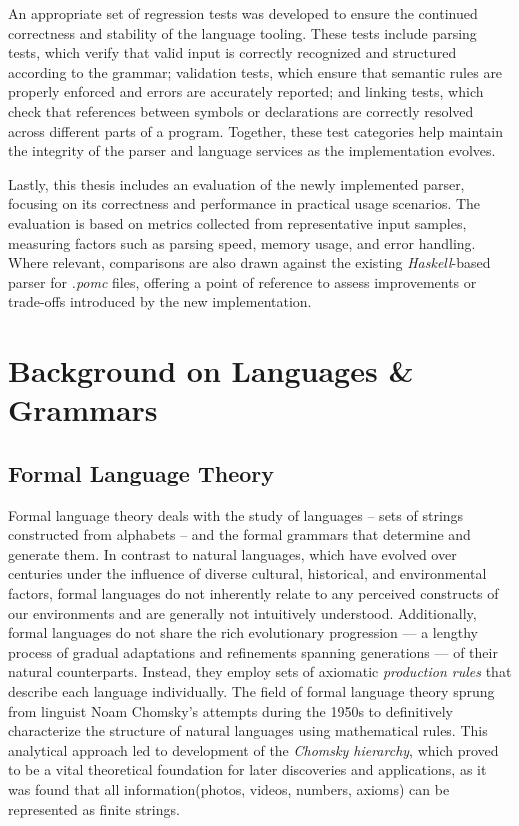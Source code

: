 \documentclass[11pt]{report}
\begin{document}
An appropriate set of regression tests was developed to ensure the continued correctness and stability of the language tooling.
These tests include parsing tests, which verify that valid input is correctly recognized and structured according to the grammar; validation tests,
which ensure that semantic rules are properly enforced and errors are accurately reported; and linking tests, which check that references between symbols
or declarations are correctly resolved across different parts of a program. Together, these test categories help maintain the integrity of the parser and language services as
the implementation evolves.

Lastly, this thesis includes an evaluation of the newly implemented parser, focusing on its correctness and performance in practical usage scenarios.
The evaluation is based on metrics collected from representative input samples, measuring factors such as parsing speed, memory usage, and error handling.
Where relevant, comparisons are also drawn against the existing \textit{Haskell}-based parser for \textit{.pomc} files, offering a point of reference to assess
improvements or trade-offs introduced by the new implementation.

\chapter{Background on Languages \& Grammars}


\section{Formal Language Theory}

Formal language theory deals with the study of languages – sets of strings constructed from alphabets – and the formal grammars that determine and generate them.
In contrast to natural languages, which have evolved over centuries under the influence of diverse cultural, historical, and environmental factors,
formal languages do not inherently relate to any perceived constructs of our environments and are generally not intuitively understood.
Additionally, formal languages do not share the rich evolutionary progression — a lengthy process of gradual adaptations and refinements spanning generations —
of their natural counterparts. Instead, they employ sets of axiomatic \textit{production rules} that describe each language individually.
The field of formal language theory sprung from linguist Noam Chomsky's attempts during the 1950s to definitively characterize the structure of natural languages
using mathematical rules.\cite{Jiang_Li_Ravikumar_Regan_2009} This analytical approach led to development of the \textit{Chomsky hierarchy}, which proved
to be a vital theoretical foundation for later discoveries and applications, as it was found that all information(photos, videos, numbers, axioms) can be
represented as finite strings.\\
\end{document}
